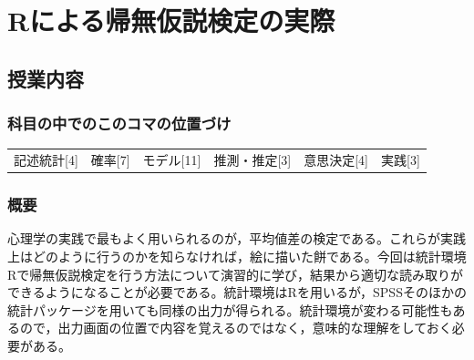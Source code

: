 \section{Rによる帰無仮説検定の実際}
\label{D1_lesson20}

\subsection{授業内容}
\subsubsection{科目の中でのこのコマの位置づけ}
\begin{tabular}[t]{cccccc}
    記述統計[4] & 確率[7] & モデル[11] & 推測・推定[3] & 意思決定[4] & 実践[3]
\end{tabular}

\subsubsection{概要}
心理学の実践で最もよく用いられるのが，平均値差の検定である。これらが実践上はどのように行うのかを知らなければ，絵に描いた餅である。今回は統計環境Rで帰無仮説検定を行う方法について演習的に学び，結果から適切な読み取りができるようになることが必要である。統計環境はRを用いるが，SPSSそのほかの統計パッケージを用いても同様の出力が得られる。統計環境が変わる可能性もあるので，出力画面の位置で内容を覚えるのではなく，意味的な理解をしておく必要がある。
